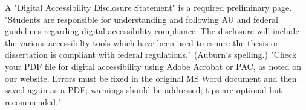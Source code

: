 %
%
%
\thesisrequiredocumentlanguage
\thesisrequiretagging
{}
	{A "Digital Accessibility Disclosure Statement" is a required preliminary
	 page. "Students are responsible for understanding and following AU and
	 federal guidelines regarding digital accessibility compliance. The
	 disclosure will include the various accessibilty tools which have been used
	 to esnure the thesis or dissertation is compliant with federal
	 regulations." (Auburn's spelling.)}
	{"Check your PDF file for digital accessibility using Adobe Acrobat or PAC,
	 as noted on our website. Errors must be fixed in the original MS Word
	 document and then saved again as a PDF; warnings should be addressed; tips
	 are optional but recommended."}
